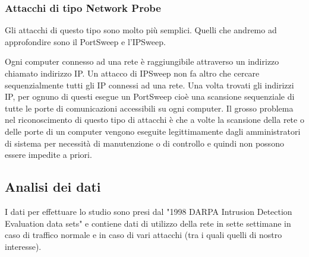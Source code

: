 \documentclass[12pt]{article}
\begin{document}
		\subsubsection{Attacchi di tipo Network Probe}
		Gli attacchi di questo tipo sono molto più semplici. Quelli che andremo ad approfondire sono il PortSweep e l'IPSweep.
		
		Ogni computer connesso ad una rete è raggiungibile attraverso un indirizzo chiamato indirizzo IP. Un attacco di IPSweep non fa altro che cercare sequenzialmente tutti gli IP connessi ad una rete. Una volta trovati gli indirizzi IP, per ognuno di questi esegue un PortSweep cioè una scansione sequenziale di tutte le porte di comunicazioni accessibili su ogni computer. Il grosso problema nel riconoscimento di questo tipo di attacchi è che a volte la scansione della rete o delle porte di un computer vengono eseguite legittimamente dagli amministratori di sistema per necessità di manutenzione o di controllo e quindi non possono essere impedite a priori.
		
	\subsection{Analisi dei dati}
		I dati per effettuare lo studio sono presi dal "1998 DARPA Intrusion Detection Evaluation data sets" e contiene dati di utilizzo della rete in sette settimane in caso di traffico normale e in caso di vari attacchi (tra i quali quelli di nostro interesse).
		
\end{document}
